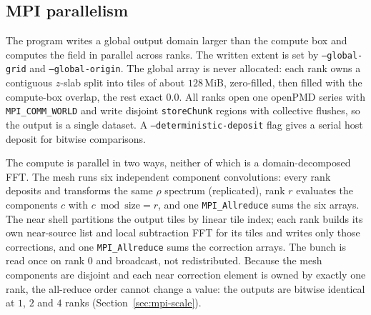 \subsection{MPI parallelism}
\label{sec:mpi}

The program writes a global output domain larger than the compute box and
computes the field in parallel across ranks. The written extent is set by
\texttt{--global-grid} and \texttt{--global-origin}. The global array is
never allocated: each rank owns a contiguous $z$-slab split into tiles of
about $128$\,MiB, zero-filled, then filled with the compute-box overlap, the
rest exact $0.0$. All ranks open one openPMD series with
\texttt{MPI\_COMM\_WORLD} and write disjoint \texttt{storeChunk} regions
with collective flushes, so the output is a single dataset. A
\texttt{--deterministic-deposit} flag gives a serial host deposit for
bitwise comparisons.

The compute is parallel in two ways, neither of which is a
domain-decomposed FFT. The mesh runs six independent component convolutions:
every rank deposits and transforms the same $\rho$ spectrum (replicated),
rank $r$ evaluates the components $c$ with $c \bmod \mathrm{size} = r$, and
one \texttt{MPI\_Allreduce} sums the six arrays. The near shell partitions
the output tiles by linear tile index; each rank builds its own near-source
list and local subtraction FFT for its tiles and writes only those
corrections, and one \texttt{MPI\_Allreduce} sums the correction arrays. The
bunch is read once on rank 0 and broadcast, not redistributed. Because the
mesh components are disjoint and each near correction element is owned by
exactly one rank, the all-reduce order cannot change a value: the outputs
are bitwise identical at $1$, $2$ and $4$ ranks (Section~\ref{sec:mpi-scale}).

